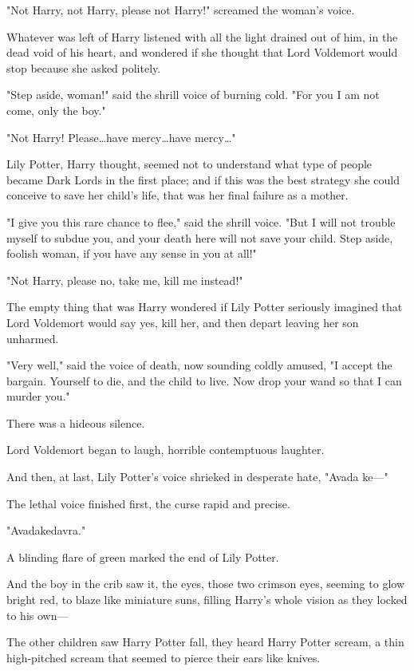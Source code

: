 \begin{em}
"Not Harry, not Harry, please not Harry!" screamed the woman's voice.

Whatever was left of Harry listened with all the light drained out of
him, in the dead void of his heart, and wondered if she thought that Lord
Voldemort would stop because she asked politely.

"Step aside, woman!" said the shrill voice of burning cold. "For you I am
not come, only the boy."

"Not Harry! Please…have mercy…have mercy…"

Lily Potter, Harry thought, seemed not to understand what type of people
became Dark Lords in the first place; and if this was the best strategy she
could conceive to save her child's life, that was her final failure as a
mother.

"I give you this rare chance to flee," said the shrill voice. "But I will
not trouble myself to subdue you, and your death here will not save your child.
Step aside, foolish woman, if you have any sense in you at all!"

"Not Harry, please no, take me, kill me instead!"

The empty thing that was Harry wondered if Lily Potter seriously imagined
that Lord Voldemort would say yes, kill her, and then depart leaving her son
unharmed.

"Very well," said the voice of death, now sounding coldly amused, "I
accept the bargain. Yourself to die, and the child to live. Now drop your wand
so that I can murder you."

There was a hideous silence.

Lord Voldemort began to laugh, horrible contemptuous laughter.

And then, at last, Lily Potter's voice shrieked in desperate hate, "Avada
ke—"

The lethal voice finished first, the curse rapid and precise.

"Avadakedavra."

A blinding flare of green marked the end of Lily Potter.

And the boy in the crib saw it, the eyes, those two crimson eyes, seeming
to glow bright red, to blaze like miniature suns, filling Harry's whole vision
as they locked to his own—
\end{em}
\later
The other children saw Harry Potter fall, they heard Harry Potter scream, a
thin high-pitched scream that seemed to pierce their ears like knives.

